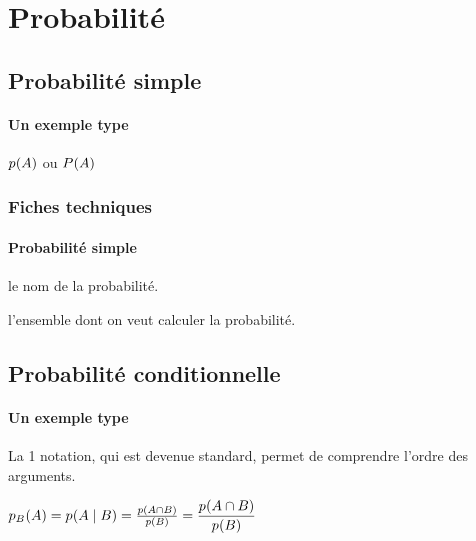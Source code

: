 \documentclass[12pt,a4paper]{article}
\begin{document}
\section{Probabilité}

\subsection{Probabilité \og simple \fg}

\paragraph{Un exemple type}

\begin{latexex}
$\proba{A}$
ou
$\proba[P]{A}$
\end{latexex}




\subsubsection{Fiches techniques}

\paragraph{Probabilité \og simple \fg}


\IDoption{} le nom de la probabilité.

\IDarg{} l'ensemble dont on veut calculer la probabilité.




\subsection{Probabilité conditionnelle}

\paragraph{Un exemple type}

La 1\iere{} notation, qui est devenue standard, permet de comprendre l'ordre des arguments.
\begin{latexex}
$\probacond{B}{A}
 =
 \probacond*{B}{A}
 =
 \probacond**{B}{A}
 =
 \dprobacond**{B}{A}$
\end{latexex}


\end{document}
